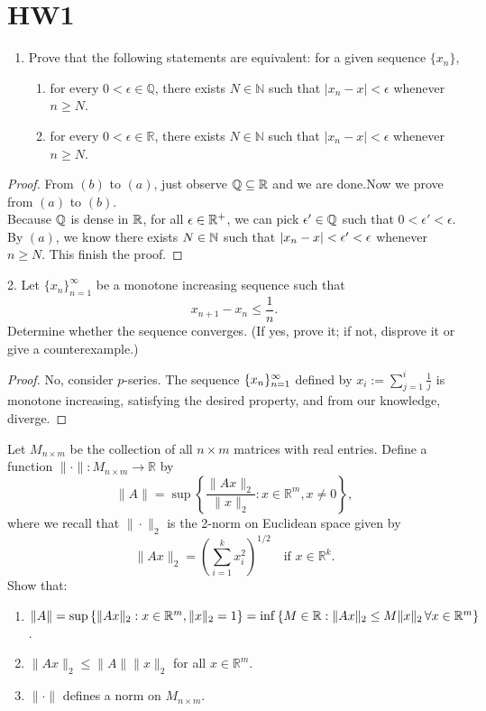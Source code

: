 \documentclass{report}
\begin{document}
\section{HW1}
\begin{question}{}{}
\begin{enumerate}
    \item Prove that the following statements are equivalent: for a given sequence $\{x_n\}$,
    \begin{enumerate}
        \item for every $0 < \epsilon \in \mathbb{Q}$, there exists $N \in \mathbb{N}$ such that $|x_n - x| < \epsilon$ whenever $n \geq N$.
        \item for every $0 < \epsilon \in \mathbb{R}$, there exists $N \in \mathbb{N}$ such that $|x_n - x| < \epsilon$ whenever $n \geq N$.
    \end{enumerate}
\end{enumerate}
\end{question}
\begin{proof}
From $(b)$ to $(a)$, just observe  $\mathbb{Q} \subseteq \mathbb{R}$ and we are done.Now we prove from $(a)$ to $(b)$.\\

Because $\mathbb{Q}$ is dense in  $\mathbb{R}$,  for all $\epsilon \in \mathbb{R}^+$, we can pick $\epsilon' \in \mathbb{Q}$ such that $0<\epsilon '< \epsilon $. By $(a)$,  we know there exists $N\in \mathbb{N}$ such that $|x_n-x|<\epsilon ' <\epsilon $ whenever $n\geq N$. This finish the proof.
\end{proof}
\begin{question}{}{}
2. Let $\{x_n\}_{n=1}^{\infty}$ be a monotone increasing sequence such that 
\[x_{n+1} - x_n \leq \frac{1}{n}.\]
Determine whether the sequence converges. (If yes, prove it; if not, disprove it or give a counterexample.)
\end{question}
\begin{proof}
No, consider $p$-series. The sequence $\{ x_n \}_{n=1}^{\infty}$ defined by $x_i:=\sum_{j=1}^i \frac{1}{j}$ is monotone increasing, satisfying the desired property, and from our knowledge, diverge. 
\end{proof}
\begin{question}{}{}
Let $M_{n \times m}$ be the collection of all $n \times m$ matrices with real entries. Define a function $\| \cdot \|: M_{n \times m} \to \mathbb{R}$ by
\[
\| A \| = \sup \left\{ \frac{\|Ax\|_2}{\|x\|_2} : x \in \mathbb{R}^m, x \neq 0 \right\},
\]
where we recall that $\| \cdot \|_2$ is the 2-norm on Euclidean space given by
\[
\| Ax \|_2 = \left( \sum_{i=1}^{k} x_i^2 \right)^{1/2} \quad \text{if } x \in \mathbb{R}^k.
\]
Show that:
\begin{enumerate}
    \item $\| A \| = \sup \left\{ \|Ax\|_2 : x \in \mathbb{R}^m, \| x \|_2 =1 \right\} = \inf \left\{ M \in \mathbb{R} : \|Ax\|_2 \leq M \|x\|_2 \, \forall x \in \mathbb{R}^m \right\}$.
    \item $\| Ax \|_2 \leq \| A \| \| x \|_2$ for all $x \in \mathbb{R}^m$.
    \item $\| \cdot \|$ defines a norm on $M_{n \times m}$.
\end{enumerate}
\end{question}
\end{document}

